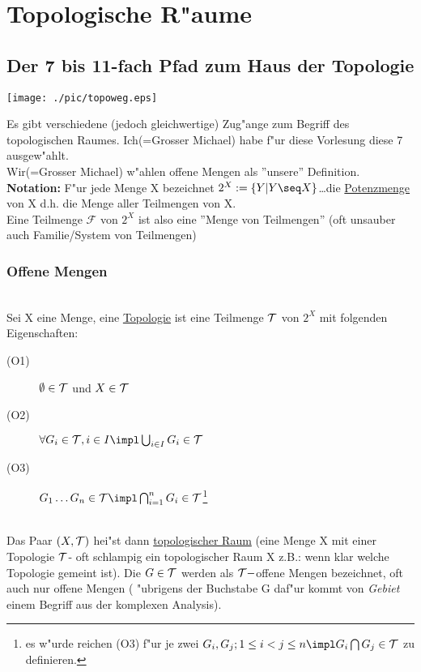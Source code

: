 \section{Topologische R"aume}
\subsection{Der 7 bis 11-fach Pfad zum Haus der Topologie}
\begin{center}
\texttt{[image: ./pic/topoweg.eps]}
\end{center}
Es gibt verschiedene (jedoch gleichwertige) Zug"ange zum Begriff des topologischen Raumes. Ich(=Grosser Michael) habe f"ur diese Vorlesung diese 7 ausgew"ahlt.\\
Wir(=Grosser Michael) w"ahlen offene Mengen als ''unsere'' Definition.\\
{\bf Notation:} F"ur jede Menge X bezeichnet $2^X:=\{Y|Y\seq X\}$\dots die \ul{Potenzmenge} von X d.h. die Menge aller Teilmengen von X.\\
\indent Eine Teilmenge ${\mathcal F}$ von $2^X$ ist also eine ''Menge von Teilmengen'' (oft unsauber auch Familie/System von Teilmengen)
\subsubsection{Offene Mengen}
\begin{definition}\label{2.1}\\
%
Sei X eine Menge, eine \ul{Topologie} ist eine Teilmenge $\mathcal T$ von $2^X$ mit folgenden Eigenschaften:
\begin{description}
\item[(O1)] $\emptyset\in\mathcal T$ und $X\in\mathcal T$
\item[(O2)] $\forall G_i\in\T, i\in I\impl \bigcup_{i\in I}G_i\in\T$
\item[(O3)] $G_1\dots G_n\in\T\impl\bigcap_{i=1}^nG_i\in\T$\footnote{es w"urde reichen (O3) f"ur je zwei $G_i,G_j; 1\leq i<j\leq n\impl G_i\bigcap G_j\in\T$ zu definieren.}
\end{description}
\end{definition}

\begin{definition}\label{2.2}\\
Das Paar $(X,\mathcal T)$ hei"st dann \ul{topologischer Raum} (eine Menge X mit einer Topologie $\mathcal T$- oft schlampig ein topologischer Raum X z.B.: wenn klar welche Topologie gemeint ist). Die $G\in\mathcal T$ werden als $\mathcal T -$offene Mengen bezeichnet, oft auch nur offene Mengen ( "ubrigens der Buchstabe G daf"ur kommt von {\it Gebiet} einem Begriff aus der komplexen Analysis).
\end{definition}

